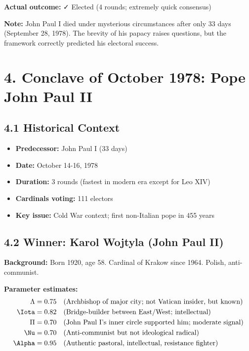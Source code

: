 \documentclass[11pt]{article}
\begin{document}
\textbf{Actual outcome:} ✓ Elected (4 rounds; extremely quick consensus)

\textbf{Note:} John Paul I died under mysterious circumstances after only 33 days (September 28, 1978). The brevity of his papacy raises questions, but the framework correctly predicted his electoral success.

\section{4. Conclave of October 1978: Pope John Paul II}

\subsection{4.1 Historical Context}

\begin{itemize}
\item \textbf{Predecessor:} John Paul I (33 days)
\item \textbf{Date:} October 14-16, 1978
\item \textbf{Duration:} 3 rounds (fastest in modern era except for Leo XIV)
\item \textbf{Cardinals voting:} 111 electors
\item \textbf{Key issue:} Cold War context; first non-Italian pope in 455 years
\end{itemize}

\subsection{4.2 Winner: Karol Wojtyla (John Paul II)}

\textbf{Background:} Born 1920, age 58. Cardinal of Krakow since 1964. Polish, anti-communist.

\textbf{Parameter estimates:}
\begin{align*}
\Lambda &= 0.75 \quad \text{(Archbishop of major city; not Vatican insider, but known)} \\
\Iota &= 0.82 \quad \text{(Bridge-builder between East/West; intellectual)} \\
\Pi &= 0.70 \quad \text{(John Paul I's inner circle supported him; moderate signal)} \\
\Nu &= 0.70 \quad \text{(Anti-communist but not ideological radical)} \\
\Alpha &= 0.95 \quad \text{(Authentic pastoral, intellectual, resistance fighter)}
\end{align*}
\end{document}
